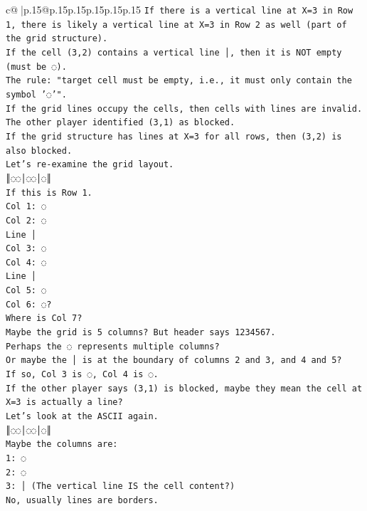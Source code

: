\documentclass{article}
\begin{document}
{\begin{supertabular}{c@{$\;$}|p{.15\linewidth}@{}p{.15\linewidth}p{.15\linewidth}p{.15\linewidth}p{.15\linewidth}p{.15\linewidth}}
{{{\texttt{If there is a vertical line at X=3 in Row 1, there is likely a vertical line at X=3 in Row 2 as well (part of the grid structure).} \\
\texttt{If the cell (3,2) contains a vertical line │, then it is NOT empty (must be ◌).} \\
\texttt{The rule: "target cell must be empty, i.e., it must only contain the symbol '◌'".} \\
\texttt{If the grid lines occupy the cells, then cells with lines are invalid.} \\
\texttt{The other player identified (3,1) as blocked.} \\
\texttt{If the grid structure has lines at X=3 for all rows, then (3,2) is also blocked.} \\
\texttt{Let's re{-}examine the grid layout.} \\
\texttt{║◌◌│◌◌│◌║} \\
\texttt{If this is Row 1.} \\
\texttt{Col 1: ◌} \\
\texttt{Col 2: ◌} \\
\texttt{Line │} \\
\texttt{Col 3: ◌} \\
\texttt{Col 4: ◌} \\
\texttt{Line │} \\
\texttt{Col 5: ◌} \\
\texttt{Col 6: ◌?} \\
\texttt{Where is Col 7?} \\
\texttt{Maybe the grid is 5 columns? But header says 1234567.} \\
\texttt{Perhaps the ◌ represents multiple columns?} \\
\texttt{Or maybe the │ is at the boundary of columns 2 and 3, and 4 and 5?} \\
\texttt{If so, Col 3 is ◌, Col 4 is ◌.} \\
\texttt{If the other player says (3,1) is blocked, maybe they mean the cell at X=3 is actually a line?} \\
\texttt{Let's look at the ASCII again.} \\
\texttt{║◌◌│◌◌│◌║} \\
\texttt{Maybe the columns are:} \\
\texttt{1: ◌} \\
\texttt{2: ◌} \\
\texttt{3: │ (The vertical line IS the cell content?)} \\
\texttt{No, usually lines are borders.} \\
}}}
\end{supertabular}}
\end{document}
